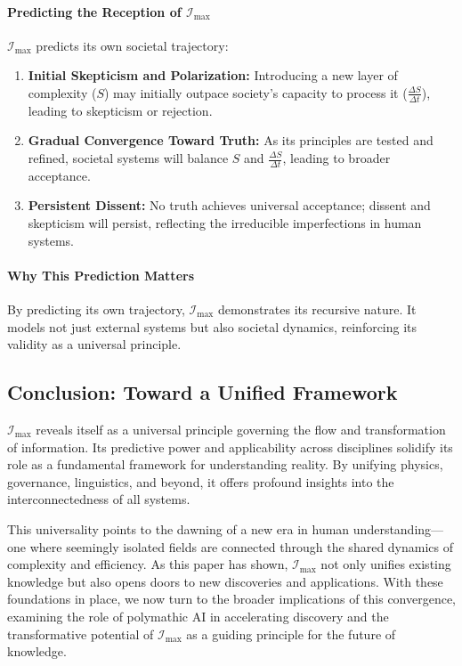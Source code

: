 \documentclass[12pt]{article}
\begin{document}
\paragraph{Predicting the Reception of \(\mathcal{I}_{\text{max}}\)}
\(\mathcal{I}_{\text{max}}\) predicts its own societal trajectory:
\begin{enumerate}
    \item \textbf{Initial Skepticism and Polarization:} Introducing a new layer of complexity (\(S\)) may initially outpace society’s capacity to process it (\(\frac{\Delta S}{\Delta t}\)), leading to skepticism or rejection.
    \item \textbf{Gradual Convergence Toward Truth:} As its principles are tested and refined, societal systems will balance \(S\) and \(\frac{\Delta S}{\Delta t}\), leading to broader acceptance.
    \item \textbf{Persistent Dissent:} No truth achieves universal acceptance; dissent and skepticism will persist, reflecting the irreducible imperfections in human systems.
\end{enumerate}

\paragraph{Why This Prediction Matters}
By predicting its own trajectory, \(\mathcal{I}_{\text{max}}\) demonstrates its recursive nature. It models not just external systems but also societal dynamics, reinforcing its validity as a universal principle.

\subsection{Conclusion: Toward a Unified Framework}
\(\mathcal{I}_{\text{max}}\) reveals itself as a universal principle governing the flow and transformation of information. Its predictive power and applicability across disciplines solidify its role as a fundamental framework for understanding reality. By unifying physics, governance, linguistics, and beyond, it offers profound insights into the interconnectedness of all systems.

This universality points to the dawning of a new era in human understanding—one where seemingly isolated fields are connected through the shared dynamics of complexity and efficiency. As this paper has shown, \(\mathcal{I}_{\text{max}}\) not only unifies existing knowledge but also opens doors to new discoveries and applications. With these foundations in place, we now turn to the broader implications of this convergence, examining the role of polymathic AI in accelerating discovery and the transformative potential of \(\mathcal{I}_{\text{max}}\) as a guiding principle for the future of knowledge.
\end{document}
